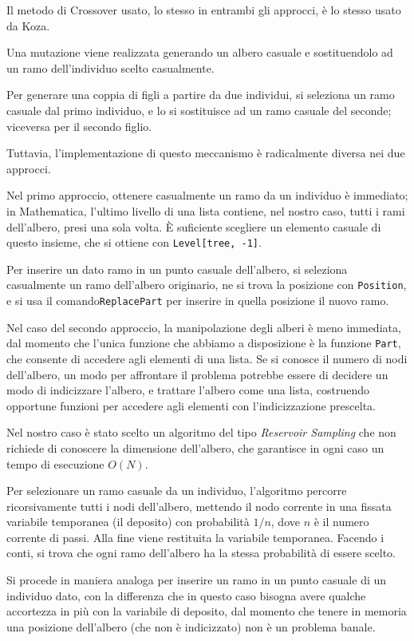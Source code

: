 \documentclass[paper=a4, fontsize=11pt]{scrartcl}
\numberwithin{equation}{section}		%
\numberwithin{figure}{section}			%
\numberwithin{table}{section}				%
\begin{document}
Il metodo di Crossover usato, lo stesso in entrambi gli approcci, è lo stesso usato da Koza.

Una  mutazione  viene realizzata generando un albero casuale e sostituendolo ad un ramo dell'individuo scelto casualmente.

Per generare una coppia di figli a partire da due individui, si seleziona un ramo casuale dal primo individuo, e lo si sostituisce ad un ramo casuale del seconde; viceversa per il secondo figlio.

Tuttavia, l'implementazione di questo meccanismo è radicalmente diversa nei due approcci.

Nel primo approccio, ottenere  casualmente un ramo da un individuo è immediato; in Mathematica, l'ultimo livello di una lista contiene, nel nostro caso, tutti i rami dell'albero, presi una sola volta. È suficiente scegliere un elemento casuale di  questo insieme, che si ottiene con \texttt{Level[tree, -1]}.

Per inserire un dato ramo in un punto casuale dell'albero, si seleziona casualmente un ramo dell'albero originario, ne si trova la posizione con \texttt{Position}, e si usa il comando\texttt{ReplacePart} per inserire in quella posizione il nuovo ramo.

Nel caso del secondo approccio, la manipolazione degli alberi è meno immediata, dal momento che l'unica funzione che abbiamo a disposizione è la funzione \texttt{Part}, che consente di accedere agli elementi di una lista. Se si conosce il numero di nodi dell'albero, un modo per affrontare il problema potrebbe essere di decidere un modo di indicizzare l'albero, e trattare l'albero come una lista, costruendo opportune funzioni per accedere agli elementi con l'indicizzazione prescelta. 

Nel nostro caso è stato scelto un algoritmo del tipo \emph{Reservoir Sampling} che non richiede di conoscere la dimensione dell'albero, che garantisce in ogni caso un tempo di esecuzione $O(N)$.

Per selezionare un ramo casuale da un individuo, l'algoritmo percorre ricorsivamente tutti i nodi  dell'albero, mettendo il nodo corrente in una fissata variabile temporanea (il deposito) con probabilità $1/n$, dove $n$ è il numero corrente di passi. Alla fine viene restituita la variabile temporanea. Facendo i conti, si trova che ogni ramo dell'albero ha la stessa probabilità di essere scelto.

Si procede in maniera analoga per inserire un ramo in un punto casuale di un individuo dato, con la differenza che in questo caso bisogna avere qualche accortezza in più con la variabile di deposito, dal momento che tenere in memoria una posizione dell'albero (che non è indicizzato) non è un problema banale.
\end{document}

